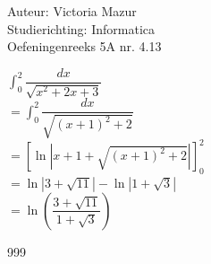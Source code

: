 \documentclass[a4paper]{article}
\begin{document}
  
\noindent \large Auteur: Victoria Mazur \\
\noindent \large Studierichting: Informatica\\
\noindent \large Oefeningenreeks 5A nr. 4.13\\

\medskip

\normalsize

$\displaystyle\int_{0}^{2} \dfrac{dx}{\sqrt{x^2+2x+3}}$ \\

$= \displaystyle\int_{0}^{2} \dfrac{dx}{\sqrt{(x+1)^2+2}}$ \\

$= \left[ \ln\left|x+1+\sqrt{(x+1)^2+2}\right| \right]_{0}^{2}$ \\

$= \ln\left|3+\sqrt{11}\right| - \ln\left|1+\sqrt{3}\right|$ \\

$= \ln\left(\dfrac{3+\sqrt{11}}{1+\sqrt{3}}\right)$ \\

\begin{thebibliography}{999}
\end{thebibliography}
\end{document}
